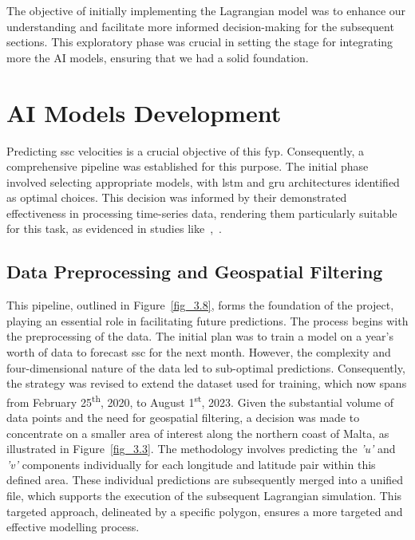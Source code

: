 The objective of initially implementing the Lagrangian model was to enhance our understanding and facilitate more informed decision-making for the subsequent sections. This exploratory phase was crucial in setting the stage for integrating more the AI models, ensuring that we had a solid foundation.

\section{AI Models Development}
\label{sec:3.3}

Predicting \acrshort{ssc} velocities is a crucial objective of this \acrshort{fyp}. Consequently, a comprehensive pipeline was established for this purpose. The initial phase involved selecting appropriate models, with \acrshort{lstm} and \acrshort{gru} architectures identified as optimal choices. This decision was informed by their demonstrated effectiveness in processing time-series data, rendering them particularly suitable for this task, as evidenced in studies like~\cite{42},~\cite{43}.

\subsection{Data Preprocessing and Geospatial Filtering}
\label{subsec:3.3.1}

This pipeline, outlined in Figure~\ref{fig_3.8}, forms the foundation of the project, playing an essential role in facilitating future predictions. The process begins with the preprocessing of the data. The initial plan was to train a model on a year's worth of data to forecast \acrshort{ssc} for the next month. However, the complexity and four-dimensional nature of the data led to sub-optimal predictions. Consequently, the strategy was revised to extend the dataset used for training, which now spans from February 25\textsuperscript{th}, 2020, to August 1\textsuperscript{st}, 2023. Given the substantial volume of data points and the need for geospatial filtering, a decision was made to concentrate on a smaller area of interest along the northern coast of Malta, as illustrated in Figure~\ref{fig_3.3}. The methodology involves predicting the \textit{'u'} and \textit{'v'} components individually for each longitude and latitude pair within this defined area. These individual predictions are subsequently merged into a unified file, which supports the execution of the subsequent Lagrangian simulation. This targeted approach, delineated by a specific polygon, ensures a more targeted and effective modelling process.

